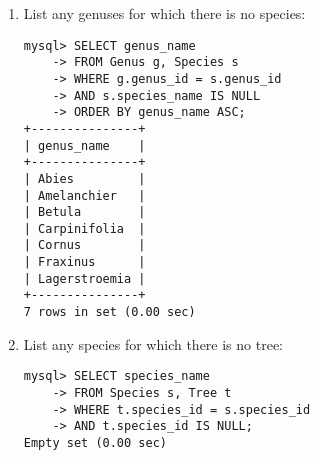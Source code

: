 \documentclass{article}
\begin{document}
\begin{enumerate}
\begin{verbatim}
    \end{verbatim}
    \item List any genuses for which there is no species:\begin{verbatim}
mysql> SELECT genus_name
    -> FROM Genus g, Species s
    -> WHERE g.genus_id = s.genus_id 
    -> AND s.species_name IS NULL
    -> ORDER BY genus_name ASC; 
+---------------+
| genus_name    |
+---------------+
| Abies         |
| Amelanchier   |
| Betula        |
| Carpinifolia  |
| Cornus        |
| Fraxinus      |
| Lagerstroemia |
+---------------+
7 rows in set (0.00 sec)
    \end{verbatim}
    \item List any species for which there is no tree: \begin{verbatim}
mysql> SELECT species_name
    -> FROM Species s, Tree t
    -> WHERE t.species_id = s.species_id
    -> AND t.species_id IS NULL; 
Empty set (0.00 sec)
    \end{verbatim}
\end{enumerate}
\end{document}
